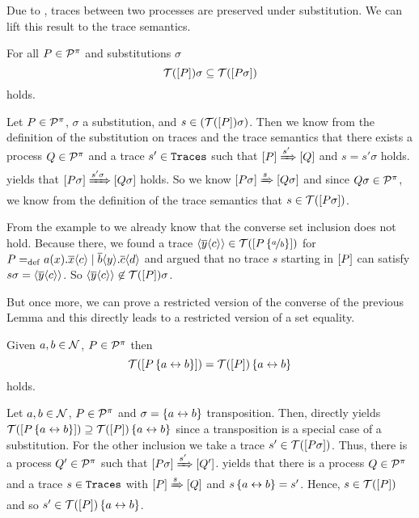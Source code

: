 Due to , traces between two processes are preserved under substitution. We can lift this result to the trace semantics.
\begin{lemma}
\label{lem_subst_trace_partI}
	For all $P\in\mathcal P^{\pi}$ and substitutions $\sigma$ 
		\[\traces[P]\sigma\subseteq\traces[P\sigma]\]
	holds.
\end{lemma}
\begin{prf}
Let $P\in\mathcal P^{\pi}$, $\sigma$ a substitution, and $s\in\left(\traces[P]\sigma\right)$. Then we know from the definition of the substitution on traces and the trace semantics that there exists a process $Q\in\mathcal P^{\pi}$ and a trace $s'\in\mathtt{Traces}$ such that $\left[P\right]\xRightarrow{s'}\left[Q\right]$ and $s=s'\sigma$ holds.  yields that $\left[P\sigma\right]\xRightarrow{s'\sigma}\left[Q\sigma\right]$ holds. So we know $\left[P\sigma\right]\xRightarrow{s}\left[Q\sigma\right]$ and since $Q\sigma\in\mathcal P^{\pi}$, we know from the definition of the trace semantics that $s\in\traces[P\sigma]$.
\end{prf}

From the example to  we already know that the converse set inclusion does not hold. Because there, we found a trace $\seq{\out{y}{c}}\in\traces[P\subs{a}{b}]$ for $P=_{\mathrm{def}}a(x).\overline{x}\langle c\rangle \mid \overline{b}\langle y\rangle.\overline{c}\langle d\rangle$ and argued that no trace $s$ starting in $\left[P\right]$ can satisfy $s\sigma=\langle\overline{y}\langle c\rangle\rangle$. So $\seq{\out{y}{c}}\nin\traces[P]\sigma$.

But once more, we can prove a restricted version of the converse of the previous Lemma and this directly leads to a restricted version of a set equality.

\begin{lemma}
\label{lem_subst_trace_partII}
Given $a,b\in\mathcal N$, $P\in\mathcal P^{\pi}$ then
\[\traces[P\transp{a}{b}]=\traces[P]\transp{a}{b}\]
holds.
\end{lemma}
\begin{prf}
Let $a,b\in\mathcal N$, $P\in\mathcal P^{\pi}$ and $\sigma=\left\{a\leftrightarrow{}b\right\}$ transposition. Then,  directly yields $\traces[P\transp{a}{b}]\supseteq\traces[P]\transp{a}{b}$ since a transposition is a special case of a substitution. For the other inclusion we take a trace $s'\in\traces[P\sigma]$. Thus, there is a process $Q'\in\mathcal P^{\pi}$ such that $\left[P\sigma\right]\xRightarrow{s'}\left[Q'\right]$.  yields that there is a process $Q\in\mathcal P^{\pi}$ and a trace $s\in\mathtt{Traces}$ with $\left[P\right]\xRightarrow{s}\left[Q\right]$ and $s\left\{a\leftrightarrow{}b\right\}=s'$. Hence, $s\in\traces[P]$ and so $s'\in\traces[P]\transp{a}{b}$.
\end{prf}

